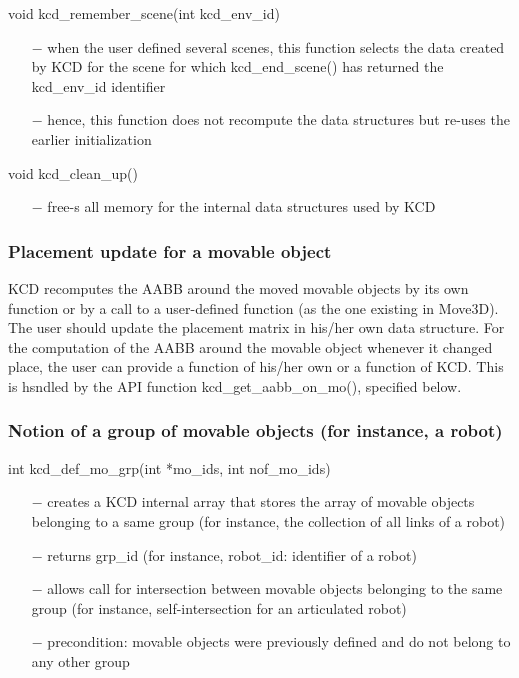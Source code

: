 void kcd\_remember\_scene(int kcd\_env\_id)
\begin{itemize}
\item[$-$] when the user defined several scenes, this function selects the
  data created by KCD for the scene for which kcd\_end\_scene() has returned
  the kcd\_env\_id identifier
\item[$-$] hence, this function does not recompute the data structures but re-uses
  the earlier initialization
\end{itemize}
void kcd\_clean\_up()
\begin{itemize}
\item[$-$] free-s all memory for the internal data structures used by KCD
\end{itemize}

\subsubsection{Placement update for a movable object}

  KCD recomputes the AABB around the moved movable objects by its 
  own function or by a call to a user-defined function (as the one 
  existing in Move3D).
  The user should update the placement matrix in his/her own data structure.
  For the computation of the AABB around the movable object whenever
  it changed place, the user can provide a function of his/her own
  or a function of KCD. This is hsndled by the API function
  kcd\_get\_aabb\_on\_mo(), specified below.

\subsubsection{Notion of a group of movable objects (for instance, a robot)}

int kcd\_def\_mo\_grp(int *mo\_ids, int nof\_mo\_ids)
\begin{itemize}
\item[$-$] creates a KCD internal array that stores the array of movable objects
  belonging to a same group (for instance, the collection of all links 
  of a robot)
\item[$-$] returns grp\_id (for instance, robot\_id: identifier of a robot)
\item[$-$] allows call for intersection between movable objects belonging
  to the same group (for instance, self-intersection for an 
  articulated robot)
\item[$-$] precondition: movable objects were previously defined and do not 
  belong to any other group
\end{itemize}

